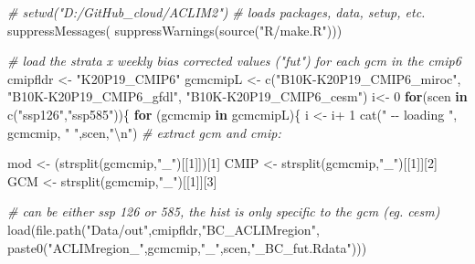 \documentclass[
]{article}
\newenvironment{Shaded}{\begin{snugshade}}{\end{snugshade}}
\newcommand{\CommentTok}[1]{\textcolor[rgb]{0.56,0.35,0.01}{\textit{#1}}}
\newcommand{\ControlFlowTok}[1]{\textcolor[rgb]{0.13,0.29,0.53}{\textbf{#1}}}
\newcommand{\DecValTok}[1]{\textcolor[rgb]{0.00,0.00,0.81}{#1}}
\newcommand{\FunctionTok}[1]{\textcolor[rgb]{0.00,0.00,0.00}{#1}}
\newcommand{\NormalTok}[1]{#1}
\newcommand{\OtherTok}[1]{\textcolor[rgb]{0.56,0.35,0.01}{#1}}
\newcommand{\SpecialCharTok}[1]{\textcolor[rgb]{0.00,0.00,0.00}{#1}}
\newcommand{\StringTok}[1]{\textcolor[rgb]{0.31,0.60,0.02}{#1}}
\begin{document}
\begin{Shaded}
\begin{Highlighting}[]
 \CommentTok{\#  setwd("D:/GitHub\_cloud/ACLIM2")}
 \CommentTok{\# loads packages, data, setup, etc.}
  \FunctionTok{suppressMessages}\NormalTok{( }\FunctionTok{suppressWarnings}\NormalTok{(}\FunctionTok{source}\NormalTok{(}\StringTok{"R/make.R"}\NormalTok{)))}


\CommentTok{\# load the strata x weekly bias corrected values ("fut") for each gcm in the cmip6}
\NormalTok{  cmipfldr }\OtherTok{\textless{}{-}} \StringTok{"K20P19\_CMIP6"}
\NormalTok{  gcmcmipL }\OtherTok{\textless{}{-}} \FunctionTok{c}\NormalTok{(}\StringTok{"B10K{-}K20P19\_CMIP6\_miroc"}\NormalTok{,}
                    \StringTok{"B10K{-}K20P19\_CMIP6\_gfdl"}\NormalTok{,}
                    \StringTok{"B10K{-}K20P19\_CMIP6\_cesm"}\NormalTok{)}
\NormalTok{i}\OtherTok{\textless{}{-}} \DecValTok{0}
\ControlFlowTok{for}\NormalTok{(scen }\ControlFlowTok{in} \FunctionTok{c}\NormalTok{(}\StringTok{"ssp126"}\NormalTok{,}\StringTok{"ssp585"}\NormalTok{))\{}
  \ControlFlowTok{for}\NormalTok{ (gcmcmip }\ControlFlowTok{in}\NormalTok{ gcmcmipL)\{}
\NormalTok{  i }\OtherTok{\textless{}{-}}\NormalTok{ i}\SpecialCharTok{+} \DecValTok{1}
  \FunctionTok{cat}\NormalTok{(}\StringTok{" {-}{-} loading "}\NormalTok{, gcmcmip, }\StringTok{" "}\NormalTok{,scen,}\StringTok{"}\SpecialCharTok{\textbackslash{}n}\StringTok{"}\NormalTok{)}
  \CommentTok{\# extract gcm and cmip:}
  
\NormalTok{  mod   }\OtherTok{\textless{}{-}}\NormalTok{ (}\FunctionTok{strsplit}\NormalTok{(gcmcmip,}\StringTok{"\_"}\NormalTok{)[[}\DecValTok{1}\NormalTok{]])[}\DecValTok{1}\NormalTok{]}
\NormalTok{  CMIP  }\OtherTok{\textless{}{-}} \FunctionTok{strsplit}\NormalTok{(gcmcmip,}\StringTok{"\_"}\NormalTok{)[[}\DecValTok{1}\NormalTok{]][}\DecValTok{2}\NormalTok{]}
\NormalTok{  GCM   }\OtherTok{\textless{}{-}} \FunctionTok{strsplit}\NormalTok{(gcmcmip,}\StringTok{"\_"}\NormalTok{)[[}\DecValTok{1}\NormalTok{]][}\DecValTok{3}\NormalTok{]}
      
  \CommentTok{\# can be either ssp 126 or 585, the hist is only specific to the gcm (eg. cesm)}
  \FunctionTok{load}\NormalTok{(}\FunctionTok{file.path}\NormalTok{(}\StringTok{"Data/out"}\NormalTok{,cmipfldr,}\StringTok{"BC\_ACLIMregion"}\NormalTok{, }\FunctionTok{paste0}\NormalTok{(}\StringTok{"ACLIMregion\_"}\NormalTok{,gcmcmip,}\StringTok{"\_"}\NormalTok{,scen,}\StringTok{"\_BC\_fut.Rdata"}\NormalTok{)))}
 

\end{Highlighting}
\end{Shaded}
\end{document}
